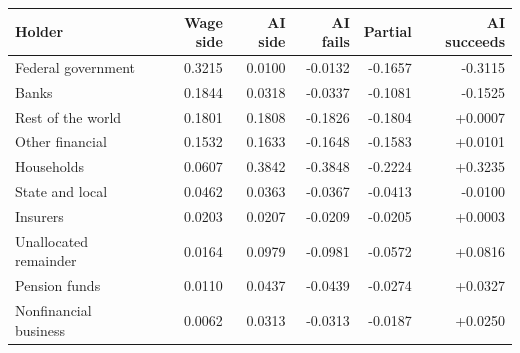 \begin{tabular}{lrrrrr}
\toprule
Holder & Wage side & AI side & AI fails & Partial & AI succeeds \\
\midrule
Federal government & 0.3215 & 0.0100 & -0.0132 & -0.1657 & -0.3115 \\
Banks & 0.1844 & 0.0318 & -0.0337 & -0.1081 & -0.1525 \\
Rest of the world & 0.1801 & 0.1808 & -0.1826 & -0.1804 & +0.0007 \\
Other financial & 0.1532 & 0.1633 & -0.1648 & -0.1583 & +0.0101 \\
Households & 0.0607 & 0.3842 & -0.3848 & -0.2224 & +0.3235 \\
State and local & 0.0462 & 0.0363 & -0.0367 & -0.0413 & -0.0100 \\
Insurers & 0.0203 & 0.0207 & -0.0209 & -0.0205 & +0.0003 \\
Unallocated remainder & 0.0164 & 0.0979 & -0.0981 & -0.0572 & +0.0816 \\
Pension funds & 0.0110 & 0.0437 & -0.0439 & -0.0274 & +0.0327 \\
Nonfinancial business & 0.0062 & 0.0313 & -0.0313 & -0.0187 & +0.0250 \\
\bottomrule
\end{tabular}
